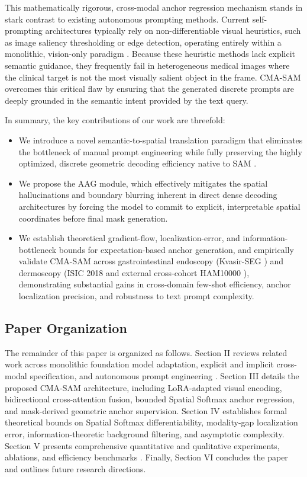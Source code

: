 \documentclass[onecolumn]{IEEEtran}
\numberwithin{equation}{section}
\theoremstyle{definition}
\theoremstyle{remark}
\begin{document}
This mathematically rigorous, cross-modal anchor regression mechanism stands in stark contrast to existing autonomous prompting methods. Current self-prompting architectures typically rely on non-differentiable visual heuristics, such as image saliency thresholding or edge detection, operating entirely within a monolithic, vision-only paradigm \cite{xie2025self, chen2024un, shaharabany2023autosam, wu2023self}. Because these heuristic methods lack explicit semantic guidance, they frequently fail in heterogeneous medical images where the clinical target is not the most visually salient object in the frame. CMA-SAM overcomes this critical flaw by ensuring that the generated discrete prompts are deeply grounded in the semantic intent provided by the text query.

In summary, the key contributions of our work are threefold:
\begin{itemize}
    \item We introduce a novel semantic-to-spatial translation paradigm that eliminates the bottleneck of manual prompt engineering while fully preserving the highly optimized, discrete geometric decoding efficiency native to SAM \cite{kirillov2023segment}.
    \item We propose the AAG module, which effectively mitigates the spatial hallucinations and boundary blurring inherent in direct dense decoding architectures by forcing the model to commit to explicit, interpretable spatial coordinates before final mask generation.
    \item We establish theoretical gradient-flow, localization-error, and information-bottleneck bounds for expectation-based anchor generation, and empirically validate CMA-SAM across gastrointestinal endoscopy (Kvasir-SEG \cite{jha2020kvasir}) and dermoscopy (ISIC 2018 \cite{codella2018skin} and external cross-cohort HAM10000 \cite{tschandl2018ham10000}), demonstrating substantial gains in cross-domain few-shot efficiency, anchor localization precision, and robustness to text prompt complexity.
\end{itemize}

\subsection{Paper Organization}

The remainder of this paper is organized as follows. Section II reviews related work across monolithic foundation model adaptation, explicit and implicit cross-modal specification, and autonomous prompt engineering \cite{ali2023prompt, shang2024prompt, ji2024segment}. Section III details the proposed CMA-SAM architecture, including LoRA-adapted visual encoding, bidirectional cross-attention fusion, bounded Spatial Softmax anchor regression, and mask-derived geometric anchor supervision. Section IV establishes formal theoretical bounds on Spatial Softmax differentiability, modality-gap localization error, information-theoretic background filtering, and asymptotic complexity. Section V presents comprehensive quantitative and qualitative experiments, ablations, and efficiency benchmarks \cite{milletari2016vnet, ma2021loss}. Finally, Section VI concludes the paper and outlines future research directions.
\end{document}
